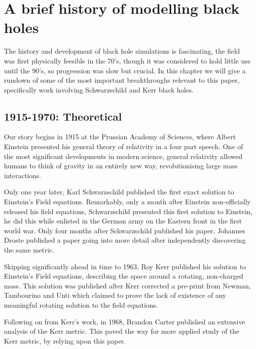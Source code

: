 \documentclass[oneside,openright,frontopenright, singlespacing]{dmathesis}
\begin{document}
\chapter{A brief history of modelling black holes}\label{chap:Chapter1}

	The history and development of black hole simulations is fascinating, the field was first physically feesible in the 70's, though it was considered to hold little use until the 90's, so progression was slow but crucial. In this chapter we will give a rundown of some of the most important breakthroughs relevant to this paper, specifically work involving Schwarzschild and Kerr black holes.

\section{1915-1970: Theoretical}\label{sec:Section1.1}

	Our story begins in 1915 at the Prussian Academy of Sciences, where Albert Einstein presented his general theory of relativity\cite{einstein1915feldgleichungen} in a four part speech. One of the most significant developments in modern science, general relativity allowed humans to think of gravity in an entirely new way, revolutionising large mass interactions.

\vspace{1em}
	Only one year later, Karl Schwarzschild published the first exact solution to Einstein's Field equations\cite{schwarzschild1916gravitationsfeld}. Remarkably, only a month after Einstein non-officially released his field equations, Schwarzschild presented this first solution to Einstein, he did this while enlisted in the German army on the Eastern front in the first world war. Only four months after Schwarzschild published his paper, Johannes Droste published a paper going into more detail after independently discovering the same metric\cite{droste1917field}.

\vspace{1em}
	Skipping significantly ahead in time to 1963, Roy Kerr published his solution to Einstein's Field equations, describing the space around a rotating, non-charged mass\cite{kerr1963gravitational}. This solution was published after Kerr corrected a pre-print from Newman, Tambourino and Unti which claimed to prove the lack of existence of any meaningful rotating solution to the field equations\cite{newman1963empty}.

\vspace{1em}
	Following on from Kerr's work, in 1968, Brandon Carter published an extensive analysis of the Kerr metric\cite{carter1968global}. This paved the way for more applied study of the Kerr metric, by relying upon this paper.
\end{document}
